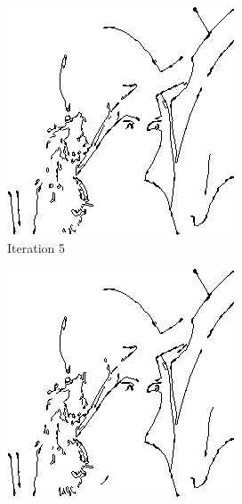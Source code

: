 \documentclass{llncs}
\begin{document}
\begin{figure}
        \begin{subfigure}[b]{0.3\textwidth}
                \includegraphics[width=\textwidth]{IMG/ImprovedSearch/Iteration5}
                \caption{Iteration 5}
                \label{fig:search_iter5}
        \end{subfigure}%
        \quad
        \begin{subfigure}[b]{0.3\textwidth}
                \includegraphics[width=\textwidth]{IMG/ImprovedSearch/Iteration6}

\end{subfigure}
\end{figure}
\end{document}
